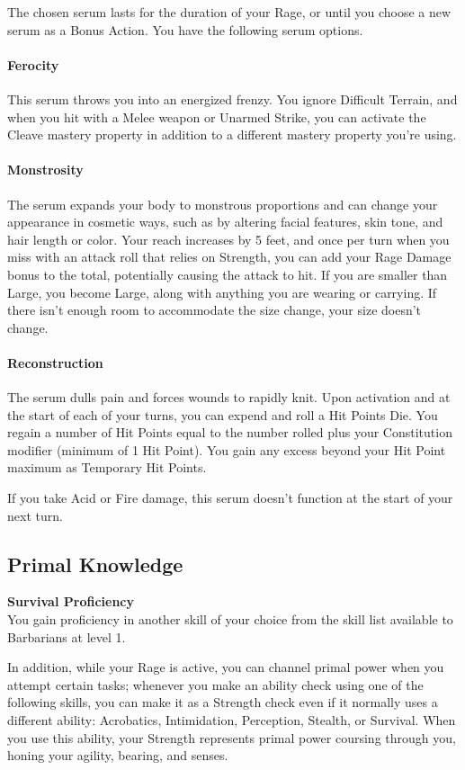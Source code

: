 \documentclass[letterpaper,openany,oneside,twocolumn]{book}
\begin{document}
The chosen serum lasts for the duration of your Rage, or until you choose a new serum as a Bonus Action. You have the following serum options.

\paragraph*{Ferocity} This serum throws you into an energized frenzy. You ignore Difficult Terrain, and when you hit with a Melee weapon or Unarmed Strike, you can activate the Cleave mastery property in addition to a different mastery property you're using.

\paragraph*{Monstrosity} The serum expands your body to monstrous proportions and can change your appearance in cosmetic ways, such as by altering facial features, skin tone, and hair length or color. Your reach increases by 5 feet, and once per turn when you miss with an attack roll that relies on Strength, you can add your Rage Damage bonus to the total, potentially causing the attack to hit. If you are smaller than Large, you become Large, along with anything you are wearing or carrying. If there isn't enough room to accommodate the size change, your size doesn't change.

\paragraph*{Reconstruction} The serum dulls pain and forces wounds to rapidly knit. Upon activation and at the start of each of your turns, you can expend and roll a Hit Points Die. You regain a number of Hit Points equal to the number rolled plus your Constitution modifier (minimum of 1 Hit Point). You gain any excess beyond your Hit Point maximum as Temporary Hit Points.

If you take Acid or Fire damage, this serum doesn't function at the start of your next turn.
\subsection*{Primal Knowledge}
\textbf{Survival Proficiency}\\
You gain proficiency in another skill of your choice from the skill list available to Barbarians at level 1.

In addition, while your Rage is active, you can channel primal power when you attempt certain tasks; whenever you make an ability check using one of the following skills, you can make it as a Strength check even if it normally uses a different ability: Acrobatics, Intimidation, Perception, Stealth, or Survival. When you use this ability, your Strength represents primal power coursing through you, honing your agility, bearing, and senses.
\end{document}

